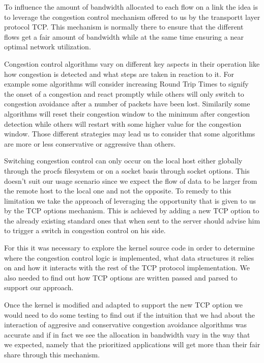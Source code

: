 \documentclass[type=bsc,accentcolor=tud9a,colorback,11pt,paper=a4report]{tudthesis}
\begin{document}
	To influence the amount of bandwidth allocated to each flow on a link
	the idea is to leverage the congestion control mechanism offered to us
	by the transportt layer protocol TCP. This mechanism is normally there
	to ensure that the different flows get a fair amount of bandwidth while
	at the same time ensuring a near optimal network utilization.

	Congestion control algorithms vary on different key aspects in their
	operation like how
	congestion is detected and what steps are taken in reaction to it.
	For example some 
	algorithms will consider increasing Round Trip Times to signify 
	the onset of a
	congestion and react promptly while others will only switch to congestion
	avoidance after a number of packets have been lost. 
	Similarily some algorithms
	will reset their congestion window to the minimum after congestion
	detection while others will restart with some higher value for the 
	congestion window. Those different
	strategies may lead us to consider that some algorithms are more or 
	less conservative or aggressive than others.

	Switching congestion control can only occur on the local host either 
	globally through the procfs filesystem or on a socket basis through
	socket options. This
	doesn't suit our usage scenario since we expect the flow of data to be
	larger from the remote host to the local one and not the opposite. 
	To remedy to this limitation we take 
	the approach of leveraging the opportunity that is given to us by the
	TCP options mechanism. This is achieved by adding
	a new TCP option to the already existing standard ones 
	that when sent to the server  should advise him
	to trigger a switch in congestion control on his side.

	For this it was necessary to explore the kernel source code in order to
	determine where
	the congestion control logic is implemented, what data structures it
	relies on and how it interacts with the rest of the TCP protocol
	implementation. We also needed to find out how TCP options are written 
	passed and
	parsed to support our approach.

	Once the kernel is modified and adapted to support the new TCP option
	we would need to do some testing to find out if the intuition that
	we had about the interaction of aggresive and conservative congestion
	avoidance algorithms was accurate and if in fact we see the allocation
	in bandwidth vary in the way that we expected, namely that the 
	prioritized applications will get more than their fair share through
	this mechanism.
\end{document}
